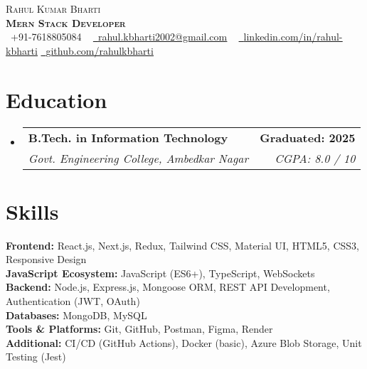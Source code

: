 \documentclass[a4paper,11pt]{article}
\makeatletter
\newcommand{\resumeSubheading}[4]{
  \vspace{-2pt}\item
    \begin{tabular*}{1.0\textwidth}[t]{l@{\extracolsep{\fill}}r}
      \textbf{#1} & \textbf{\small #2} \\
      \textit{\small#3} & \textit{\small #4} \\
    \end{tabular*}\vspace{-6pt}
}
\newcommand{\resumeSubHeadingListStart}{\begin{itemize}[leftmargin=0.0in, label={}]}
\newcommand{\resumeSubHeadingListEnd}{\end{itemize}}
\makeatother
\begin{document}
\begin{center}
    {\Huge \scshape Rahul Kumar Bharti} \\ \vspace{4pt}
    \textbf{\Large \scshape Mern Stack Developer} \\ \vspace{4pt}
    \small \faPhone\ +91-7618805084 ~ 
    \href{mailto:rahul.kbharti2002@gmail.com}{\faEnvelope\ \underline{rahul.kbharti2002@gmail.com}} ~ 
    \href{https://www.linkedin.com/in/rahul-kbharti}{\faLinkedin\ \underline{linkedin.com/in/rahul-kbharti}} 
    \href{https://github.com/rahulkbharti}{\faGithub\ \underline{github.com/rahulkbharti}} 
\end{center}


\section{Education}
\resumeSubHeadingListStart
  \resumeSubheading
    {B.Tech. in Information Technology}{Graduated: 2025}
    {Govt. Engineering College, Ambedkar Nagar}{CGPA: 8.0 / 10}
\resumeSubHeadingListEnd

\section{Skills}
\textbf{Frontend:} React.js, Next.js, Redux, Tailwind CSS, Material UI, HTML5, CSS3, Responsive Design \\
\textbf{JavaScript Ecosystem:} JavaScript (ES6+), TypeScript, WebSockets \\
\textbf{Backend:} Node.js, Express.js, Mongoose ORM, REST API Development, Authentication (JWT, OAuth) \\
\textbf{Databases:} MongoDB, MySQL \\
\textbf{Tools \& Platforms:} Git, GitHub, Postman, Figma, Render \\
\textbf{Additional:} CI/CD (GitHub Actions), Docker (basic), Azure Blob Storage, Unit Testing (Jest)
\end{document}
